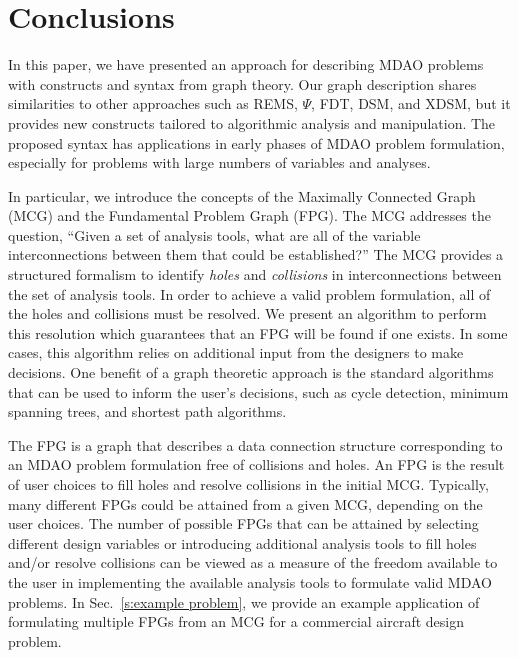 \section*{Conclusions}
In this paper, we have presented an approach for describing MDAO problems with constructs and syntax from graph theory.
Our graph description shares similarities to other approaches such as REMS, $\Psi$, FDT,
DSM, and XDSM, but it provides new constructs tailored to algorithmic analysis and
manipulation. The proposed syntax has applications in early phases of MDAO problem
formulation, especially for problems with large numbers of variables and analyses.

In particular, we introduce the concepts of the Maximally Connected Graph (MCG) and
the Fundamental Problem Graph (FPG).
The MCG addresses the question, ``Given a set of analysis tools,
what are all of the variable interconnections between them that could be established?''
The MCG provides a structured formalism to identify \textit{holes} and
\textit{collisions} in interconnections between the set of analysis tools.
In order to achieve a valid problem formulation, all of the holes and collisions must
be resolved. We present an algorithm to perform this resolution which guarantees that an FPG will be found if one exists. In some cases, this algorithm relies on additional input from the
designers to make decisions. One benefit of a graph theoretic approach is the standard
algorithms that can be used to inform the user's decisions, such as cycle detection,
minimum spanning trees, and shortest path algorithms.

The FPG is a graph that describes a data connection structure corresponding
to an MDAO problem formulation free of collisions and holes.
An FPG is the result of user choices to fill holes and resolve collisions in
the initial MCG. Typically, many different FPGs could be attained from a given MCG,
depending on the user choices. The number of possible FPGs that can be attained by
selecting different design variables or introducing additional analysis tools to
fill holes and/or resolve collisions can be viewed as a measure of the freedom
available to the user in implementing the available analysis tools to
formulate valid MDAO problems. In Sec.~\ref{s:example problem},
we provide an example application of formulating multiple FPGs from an MCG
for a commercial aircraft design problem.


